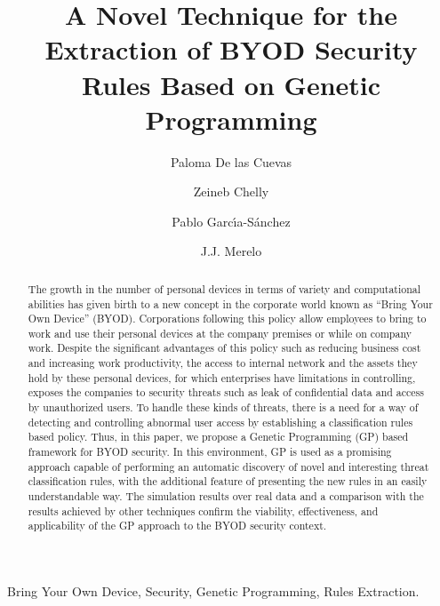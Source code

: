 \documentclass[a4paper,10pt,twocolumn,preprint,3p]{elsarticle}
\begin{document}
\begin{frontmatter}

\title{A Novel Technique for the Extraction of BYOD Security Rules  Based on Genetic Programming}

\author[ugr]{Paloma De las Cuevas}
\author[isgt]{Zeineb Chelly}
\author[ugr]{Pablo Garc\'{\i}a-S\'anchez}
\author[ugr]{J.J. Merelo}

\address[ugr]{Department of Computer Architecture and Computer Technology, ETSIIT and CITIC \\
University of Granada, Granada, Spain. Tel: +34958241778. Fax: +34958248993}
\address[isgt]{LARODEC, Institut Sup\'erieur de Gestion de Tunis, Tunisia.}


\begin{abstract}
The growth in the number of personal devices in terms of variety and computational
abilities has given birth to a 
new concept in the corporate world
known as ``Bring Your Own Device'' (BYOD).
Corporations following this policy allow 
employees to bring to work and use their personal devices at
the company premises or while on company work. Despite the  significant advantages of this policy such as reducing
business cost and increasing work productivity, the access to internal network and the assets they hold by these personal devices, for which
enterprises have limitations in controlling, exposes the companies to
security threats such as leak of confidential data and access by
unauthorized users. %
To handle these kinds of threats, there
is a need for a way of detecting and controlling abnormal user
access by establishing a classification rules based policy. Thus, in
this paper, we propose a Genetic Programming (GP) based framework for
BYOD security. In this environment, GP is used as a promising approach
capable of performing an automatic discovery of novel and interesting
threat classification rules, with the additional feature of presenting the new rules in an easily understandable way.
The simulation results over real data and a
comparison with the results achieved by other techniques confirm the
viability, effectiveness, and applicability of the GP approach to the
BYOD security context.
\end{abstract}


\begin{keyword}
Bring Your Own Device, Security, Genetic Programming, Rules Extraction. 
\end{keyword}

\end{frontmatter}
\end{document}
